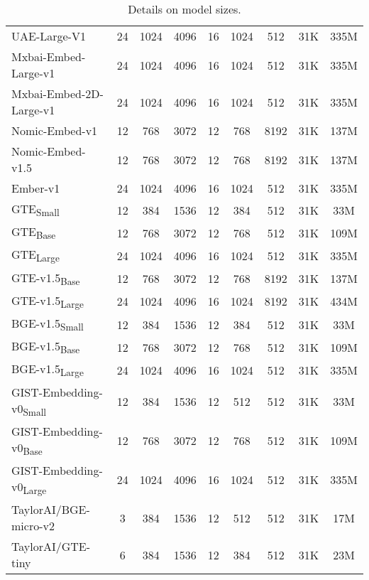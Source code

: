 \begin{table}[ht!]
\begin{tabular}{lcccccccc}
    UAE-Large-V1 & 24 & 1024 & 4096 & 16 & 1024 & 512 & 31K & 335M \\
    Mxbai-Embed-Large-v1 & 24 & 1024 & 4096 & 16 & 1024 & 512 & 31K & 335M \\
    Mxbai-Embed-2D-Large-v1 & 24 & 1024 & 4096 & 16 & 1024 & 512 & 31K & 335M \\
    Nomic-Embed-v1 & 12 & 768 & 3072 & 12 & 768 & 8192 & 31K & 137M \\
    Nomic-Embed-v1.5 & 12 & 768 & 3072 & 12 & 768 & 8192 & 31K & 137M \\
    Ember-v1 & 24 & 1024 & 4096 & 16 & 1024 & 512 & 31K & 335M \\
    GTE\textsubscript{Small} & 12 & 384 & 1536 & 12 & 384 & 512 & 31K & 33M \\
    GTE\textsubscript{Base} & 12 & 768 & 3072 & 12 & 768 & 512 & 31K & 109M \\
    GTE\textsubscript{Large} & 24 & 1024 & 4096 & 16 & 1024 & 512 & 31K & 335M \\
    GTE-v1.5\textsubscript{Base} & 12 & 768 & 3072 & 12 & 768 & 8192 & 31K & 137M \\
    GTE-v1.5\textsubscript{Large} & 24 & 1024 & 4096 & 16 & 1024 & 8192 & 31K & 434M \\
    BGE-v1.5\textsubscript{Small} & 12 & 384 & 1536 & 12 & 384 & 512 & 31K & 33M \\
    BGE-v1.5\textsubscript{Base} & 12 & 768 & 3072 & 12 & 768 & 512 & 31K & 109M \\
    BGE-v1.5\textsubscript{Large} & 24 & 1024 & 4096 & 16 & 1024 & 512 & 31K & 335M \\
    GIST-Embedding-v0\textsubscript{Small} & 12 & 384 & 1536 & 12 & 512 & 512 & 31K & 33M \\
    GIST-Embedding-v0\textsubscript{Base}  & 12 & 768 & 3072 & 12 & 768 & 512 & 31K & 109M \\
    GIST-Embedding-v0\textsubscript{Large} & 24 & 1024 & 4096 & 16 & 1024 & 512 & 31K & 335M \\
    TaylorAI/BGE-micro-v2 & 3 & 384 & 1536 & 12 & 512 & 512 & 31K & 17M \\
    TaylorAI/GTE-tiny & 6 & 384 & 1536 & 12 & 384 & 512 & 31K & 23M \\
    \bottomrule
  \end{tabular}
  \caption{Details on model sizes.}
  \label{tab:parameters}
\end{table}
  